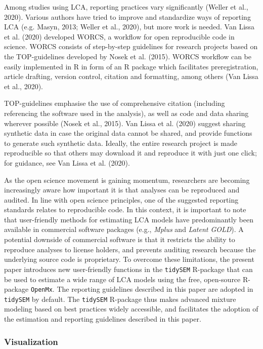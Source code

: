 \documentclass[
  ,man,floatsintext]{apa6}
\begin{document}
Among studies using LCA, reporting practices vary significantly (Weller et al., 2020).
Various authors have tried to improve and standardize ways of reporting LCA
(e.g. Masyn, 2013; Weller et al., 2020),
but more work is needed.
Van Lissa et al. (2020) developed WORCS,
a workflow for open reproducible code in science.
WORCS consists of step-by-step guidelines for research projects
based on the TOP-guidelines developed by Nosek et al. (2015).
WORCS workflow can be easily implemented in R in form of
an R package which facilitates preregistration, article drafting,
version control, citation and formatting, among others (Van Lissa et al., 2020).

TOP-guidelines emphasise the use of comprehensive citation
(including referencing the software used in the analysis),
as well as code and data sharing wherever possible (Nosek et al., 2015).
Van Lissa et al. (2020) suggest sharing synthetic data in case
the original data cannot be shared,
and provide functions to generate such synthetic data.
Ideally, the entire research project is made reproducible
so that others may download it and reproduce it with just one click;
for guidance, see Van Lissa et al. (2020).

As the open science movement is gaining momentum,
researchers are becoming increasingly aware
how important it is that analyses can be reproduced and audited.
In line with open science principles,
one of the suggested reporting standards relates to reproducible code.
In this context, it is important to note that
user-friendly methods for estimating LCA models
have predominantly been available in commercial software packages
(e.g., \emph{Mplus} and \emph{Latent GOLD}).
A potential downside of commercial software is that
it restricts the ability to reproduce analyses to license holders,
and prevents auditing research because
the underlying source code is proprietary.
To overcome these limitations,
the present paper introduces new user-friendly functions in
the \texttt{tidySEM} R-package that can be used to
estimate a wide range of LCA models
using the free, open-source R-package \texttt{OpenMx}.
The reporting guidelines described in this paper
are adopted in \texttt{tidySEM} by default.
The \texttt{tidySEM} R-package thus makes advanced mixture modeling
based on best practices widely accessible,
and facilitates the adoption of the estimation and
reporting guidelines described in this paper.

\hypertarget{visualization}{%
\subsubsection{Visualization}\label{visualization}}
\end{document}
